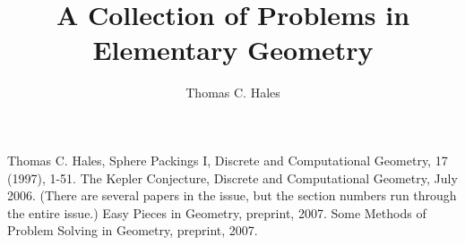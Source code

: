 \documentclass[11pt]{amsart}
\title{A Collection of Problems in Elementary Geometry}
\author{Thomas C. Hales}
\def\svninfo{SVN:133, 4/7/2008}
\begin{document}
\maketitle

\symbolfootnote[0]{\svninfo}

\def\pdffigtemplate#1#2#3{%
\begin{figure}[htb]%
  \centering
  \myincludegraphics{\pdf/#1}
  \caption{#3}
  \label{tarski:fig:#2}%
\end{figure}%
}
\def\usegraphics{
\def\pdf{/Users/thomashales/Pictures/collect_geom}
\def\pdffig{\pdffigtemplate}
}
\def\pdffig#1#2#3{}
\def\myincludegraphics#1{\texttt{[image: noimage.eps]}}
 
\tableofcontents







\newpage
\begin{thebibliography}{CHMS94}
 Thomas C. Hales, Sphere Packings I,
    Discrete and Computational Geometry, 17 (1997), 1-51.
 The Kepler Conjecture, Discrete and
Computational Geometry, July 2006. (There are several papers in
the issue, but the section numbers run through the entire issue.)
 Easy Pieces in Geometry, preprint, 2007.
 Some Methods of Problem
Solving in Geometry, preprint, 2007.
\end{thebibliography}

{

\twocolumn{
}

}

\end{document}
